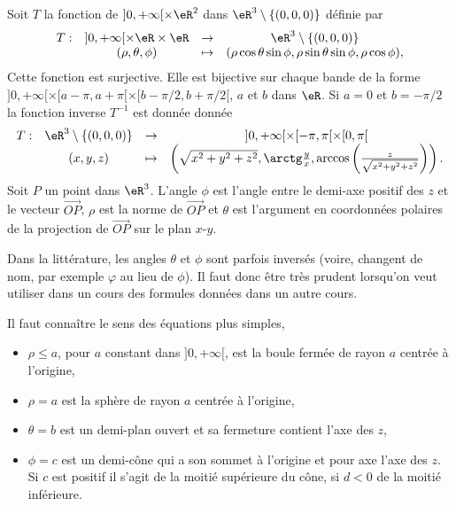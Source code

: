 Soit $T$ la fonction de $]0, +\infty[\times \eR^2$ dans $\eR^3\setminus\{(0,0,0)\}$ définie par
\begin{equation}
  \begin{array}{lccc}
    T: &]0, +\infty[\times \eR\times \eR & \to & \eR^3\setminus\{(0,0,0)\}\\
 & (\rho, \theta, \phi)&\mapsto& (\rho\cos \theta\sin \phi, \rho \sin \theta\sin \phi, \rho\cos \phi),
  \end{array}
\end{equation}
Cette fonction est surjective. Elle est bijective sur chaque bande de la forme  $]0, +\infty[\times [a-\pi,a+\pi[\times [b-\pi/2, b+\pi/2[$, $a$ et $b$ dans $\eR$.  Si $a =0$ et $b=-\pi/2$ la fonction inverse $T^{-1}$ est donnée donnée
\begin{equation}
  \begin{array}{lccc}
    T: &\eR^3\setminus\{(0,0,0)\} & \to & ]0, +\infty[\times [-\pi,\pi[\times [0, \pi[\\
 & (x,y,z)&\mapsto& \left(\sqrt{x^2+y^2+z^2}, \arctg \frac{y}{x}, \arccos \left(\frac{z}{\sqrt{x^2+y^2+z^2}}\right)\right). 
  \end{array}
\end{equation}
Soit $ P$ un point dans $\eR^3$. L'angle $\phi$ est l'angle entre le demi-axe positif des $z$ et le vecteur $\overrightarrow{OP}$, $\rho$ est la norme de $\overrightarrow{OP}$ et $\theta$ est l'argument en coordonnées polaires de la projection de $\overrightarrow{OP}$ sur le plan $x$-$y$.  

\begin{remark}
	Dans la littérature, les angles $\theta$ et $\phi$ sont parfois inversés (voire, changent de nom, par exemple $\varphi$ au lieu de $\phi$). Il faut donc être très prudent lorsqu'on veut utiliser dans un cours des formules données dans un autre cours.
\end{remark}

\begin{example}
Il faut connaître le sens des équations plus simples, 
\begin{itemize}
\item $\rho\leq a$, pour $a$ constant dans  $]0, +\infty[$, est la boule fermée de rayon $a$ centrée à l'origine, 
\item $\rho= a$ est  la sphère de rayon $a$ centrée à l'origine,
\item $\theta = b$ est un demi-plan ouvert et sa fermeture contient l'axe des $z$,
\item $\phi= c$ est un demi-cône qui a  son sommet à l'origine et  pour axe l'axe des $z$.  Si $c$ est positif  il s'agit  de la moitié supérieure du cône, si $d<0$ de la moitié inférieure. 
\end{itemize}
 \end{example}

